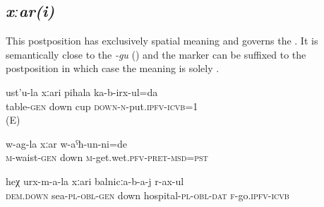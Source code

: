 
\subsection{\textit{xːar(i)} }
\label{ssec:postposition xari}

This postposition has exclusively spatial meaning  and governs the  . It is semantically close to the  \textit{-gu} () and the  marker can be suffixed to the postposition in which case the meaning is solely .
%
\begin{exe}
	\ex
	\begin{xlist}
		\ex	\label{I put the cup under the table / to the bottom of the table}
		\gll	ust'u-la	xːari	pihala	ka-b-irx-ul=da  \\
			table-\textsc{gen}	down	cup	\textsc{down-n}-put.\textsc{ipfv}-\textsc{icvb}=1\\
		\glt	{} (E)

		\ex	\label{From the waist down I was wet}
		\gll	 w-ag-la	xːar	w-aˁħ-un-ni=de \\
			\textsc{m}-waist-\textsc{gen}	down	\textsc{m}-get.wet.\textsc{pfv}-\textsc{pret}-\textsc{msd}=\textsc{pst}\\
		\glt	{}

		\ex	\label{I went to the hospital down at the sea}
		\gll	heχ	urx-m-a-la	xːari	balnicːa-b-a-j	r-ax-ul\\
			\textsc{dem.down}	sea-\textsc{pl}-\textsc{obl}-\textsc{gen}	down	hospital-\textsc{pl}-\textsc{obl}-\textsc{dat}	\textsc{f}-go.\textsc{ipfv}-\textsc{icvb}\\
		\glt	{}
	\end{xlist}
\end{exe}



